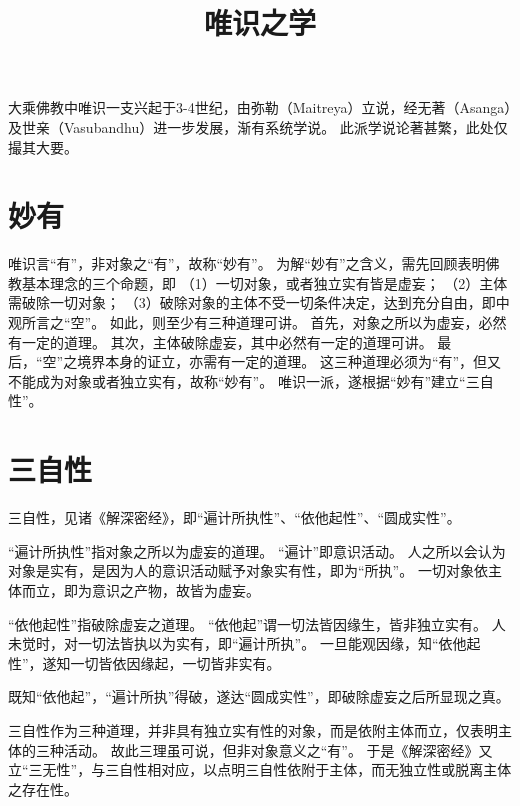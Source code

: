 \documentclass[11pt]{article}
\title{唯识之学}
\date{}
\begin{document}
  \maketitle

  \linenumbers

大乘佛教中唯识一支兴起于3-4世纪，由弥勒（Maitreya）立说，经无著（Asanga）及世亲（Vasubandhu）进一步发展，渐有系统学说。
此派学说论著甚繁，此处仅撮其大要。

\section{妙有}
唯识言“有”，非对象之“有”，故称“妙有”。
为解“妙有”之含义，需先回顾表明佛教基本理念的三个命题，即
（1）一切对象，或者独立实有皆是虚妄；
（2）主体需破除一切对象；
（3）破除对象的主体不受一切条件决定，达到充分自由，即中观所言之“空”。
如此，则至少有三种道理可讲。
首先，对象之所以为虚妄，必然有一定的道理。
其次，主体破除虚妄，其中必然有一定的道理可讲。
最后，“空”之境界本身的证立，亦需有一定的道理。
这三种道理必须为“有”，但又不能成为对象或者独立实有，故称“妙有”。
唯识一派，遂根据“妙有”建立“三自性”。

\section{三自性}
三自性，见诸《解深密经》，即“遍计所执性”、“依他起性”、“圆成实性”。

\par

“遍计所执性”指对象之所以为虚妄的道理。
“遍计”即意识活动。
人之所以会认为对象是实有，是因为人的意识活动赋予对象实有性，即为“所执”。
一切对象依主体而立，即为意识之产物，故皆为虚妄。

\par

“依他起性”指破除虚妄之道理。
“依他起”谓一切法皆因缘生，皆非独立实有。
人未觉时，对一切法皆执以为实有，即“遍计所执”。
一旦能观因缘，知“依他起性”，遂知一切皆依因缘起，一切皆非实有。

\par

既知“依他起”，“遍计所执”得破，遂达“圆成实性”，即破除虚妄之后所显现之真。

\par

三自性作为三种道理，并非具有独立实有性的对象，而是依附主体而立，仅表明主体的三种活动。
故此三理虽可说，但非对象意义之“有”。
于是《解深密经》又立“三无性”，与三自性相对应，以点明三自性依附于主体，而无独立性或脱离主体之存在性。
\end{document}
